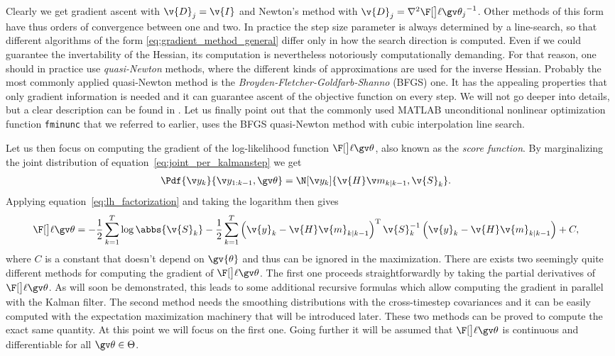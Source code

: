 Clearly we get gradient ascent with $\v{D}_j=\v{I}$
and Newton's method with  $\v{D}_j=\nabla^2\lLH[\Th_j]^{-1}$. 
Other methods of this form have thus orders of convergence
between one and two. In practice the step
size parameter is always determined by a line-search, so that different
algorithms of the form \eqref{eq:gradient_method_general} differ only in how
the search direction is computed. Even if we could guarantee the invertability of the Hessian, its computation is
nevertheless notoriously computationally demanding. For that reason, one should
in practice use \emph{quasi-Newton} methods, where the different kinds of
approximations are used for the inverse Hessian. Probably the most commonly
applied quasi-Newton method is the \emph{Broyden-Fletcher-Goldfarb-Shanno} (BFGS)
one. It has the appealing properties that only gradient information is needed
and it can guarantee ascent of the objective function on every step. We will not
go deeper into details, but a clear description can be found in \textcite{luenberger2008}.
Let us finally point out that the commonly used MATLAB unconditional nonlinear
optimization function \texttt{fminunc} that we referred to earlier, uses
the BFGS quasi-Newton method with cubic interpolation line search.


Let us then focus on computing the gradient of the
log-likelihood function $\lLH$, also known as the \emph{score function}.
By marginalizing the joint distribution of equation~\eqref{eq:joint_per_kalmanstep}
we get 
\begin{align}
	\Pdf{\y_k}{\y_{1:k-1},\Th}&=\N[\yk]{\v{H}\m_{k|k-1},\v{S}_k }.
\end{align}
Applying equation~\eqref{eq:lh_factorization} and taking the logarithm then gives
\begin{align}
	\lLH&=-\frac{1}{2}\sum_{k=1}^T\log\abbs{\v{S}_k}
	-\frac{1}{2}\sum_{k=1}^T\left(\v{y}_k-\v{H}\v{m}_{k|k-1}\right)^\tr\v{S}_{k}^{-1}\left(\v{y}_k-\v{H}\v{m}_{k|k-1}\right)+C,
	\label{eq:logLH}
\end{align}
where $C$ is a constant that doesn't depend on $\gv{\theta}$ and thus can
be ignored in the maximization.
There are exists two seemingly quite different methods for computing
the gradient of $\lLH$. The first one proceeds straightforwardly by taking the
partial derivatives of $\lLH$. As will soon be demonstrated, this leads
to some additional recursive formulas which allow computing
the gradient in parallel with the Kalman filter. The second method needs
the smoothing distributions with the cross-timestep covariances
and it can be easily computed with the expectation maximization machinery
that will be introduced later. These two methods can be proved to compute
the exact same quantity. At this point we will focus on the first one. Going further
it will be assumed that $\lLH$ is continuous and differentiable for all $\Th\in\Theta$.

